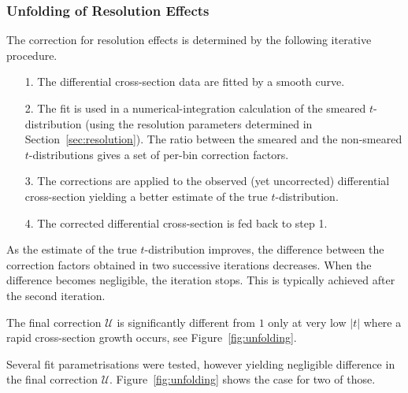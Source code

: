 
\subsubsection{Unfolding of Resolution Effects}
\label{sec:unfolding}

The correction for resolution effects is determined by the following iterative procedure.
\begin{itemize}
\item[1.] The differential cross-section data are fitted by a smooth curve.
\item[2.] The fit is used in a numerical-integration calculation of the smeared $t$-distribution (using the resolution parameters determined in Section~\ref{sec:resolution}). The ratio between the smeared and the non-smeared $t$-distributions gives a set of per-bin correction factors.
\item[3.] The corrections are applied to the observed (yet uncorrected) differential cross-section yielding a better estimate of the true $t$-distribution.
\item[4.] The corrected differential cross-section is fed back to step 1.
\end{itemize}
As the estimate of the true $t$-distribution improves, the difference between the correction factors obtained in two successive iterations decreases. When the difference becomes negligible, the iteration stops. This is typically achieved after the second iteration. 

The final correction $\mathcal{U}$ is significantly different from $1$ only at very low $|t|$ where a rapid cross-section growth occurs, see Figure~\ref{fig:unfolding}.

Several fit parametrisations were tested, however yielding negligible difference in the final correction $\mathcal{U}$. Figure~\ref{fig:unfolding} shows the case for two of those.

